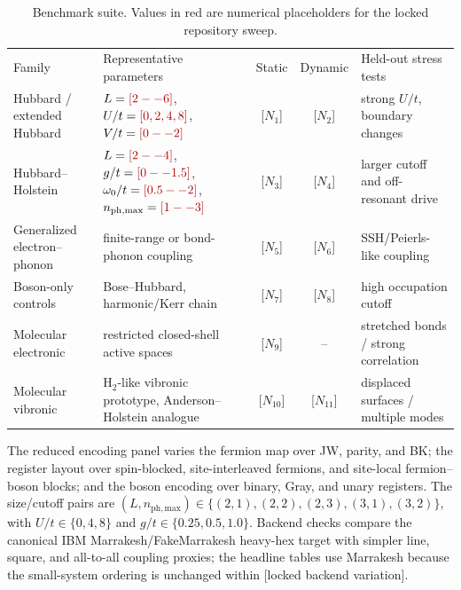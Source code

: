 \documentclass[
  reprint,
  amsmath,
  amssymb,
  aps,
  pra,
  nofootinbib,
  superscriptaddress,
  floatfix
]{revtex4-2}
\newcommand{\placeholder}[1]{\textcolor{red!70!black}{\ifmmode\left[#1\right]\else\textsf{[#1]}\fi}}
\newcommand{\phmax}{n_{\mathrm{ph,max}}}
\begin{document}
\begin{table}[t]
\small
\setlength{\tabcolsep}{4pt}
\caption{Benchmark suite. Values in red are numerical placeholders for the locked repository sweep.}
\label{tab:benchmark_suite}
\begin{ruledtabular}
\begin{tabular*}{\textwidth}{@{\extracolsep{\fill}}p{}p{}ccp{}@{}}
Family & Representative parameters & Static & Dynamic & Held-out stress tests \\
\colrule
Hubbard / extended Hubbard & $L=\placeholder{2--6}$, $U/t=\placeholder{0,2,4,8}$, $V/t=\placeholder{0--2}$ & \placeholder{$N_1$} & \placeholder{$N_2$} & strong $U/t$, boundary changes \\
Hubbard--Holstein & $L=\placeholder{2--4}$, $g/t=\placeholder{0--1.5}$, $\omega_0/t=\placeholder{0.5--2}$, $\phmax=\placeholder{1--3}$ & \placeholder{$N_3$} & \placeholder{$N_4$} & larger cutoff and off-resonant drive \\
Generalized electron--phonon & finite-range or bond-phonon coupling & \placeholder{$N_5$} & \placeholder{$N_6$} & SSH/Peierls-like coupling \\
Boson-only controls & Bose--Hubbard, harmonic/Kerr chain & \placeholder{$N_7$} & \placeholder{$N_8$} & high occupation cutoff \\
Molecular electronic & restricted closed-shell active spaces & \placeholder{$N_9$} & -- & stretched bonds / strong correlation \\
Molecular vibronic & H$_2$-like vibronic prototype, Anderson--Holstein analogue & \placeholder{$N_{10}$} & \placeholder{$N_{11}$} & displaced surfaces / multiple modes \\
\end{tabular*}
\end{ruledtabular}
\end{table}

The reduced encoding panel varies the fermion map over JW, parity, and BK; the register layout over spin-blocked, site-interleaved fermions, and site-local fermion--boson blocks; and the boson encoding over binary, Gray, and unary registers. The size/cutoff pairs are $(L,\phmax)\in\{(2,1),(2,2),(2,3),(3,1),(3,2)\}$, with $U/t\in\{0,4,8\}$ and $g/t\in\{0.25,0.5,1.0\}$. Backend checks compare the canonical IBM Marrakesh/FakeMarrakesh heavy-hex target with simpler line, square, and all-to-all coupling proxies; the headline tables use Marrakesh because the small-system ordering is unchanged within \placeholder{locked backend variation}.
\end{document}
